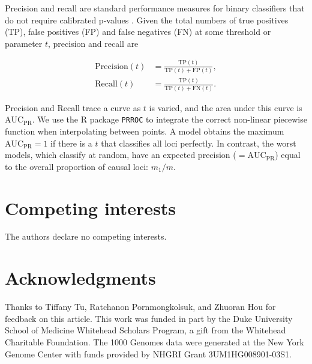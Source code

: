\documentclass[9pt,lineno]{elife}
\newcommand{\auc}{\text{AUC}_\text{PR}}
\begin{document}
Precision and recall are standard performance measures for binary classifiers that do not require calibrated p-values \citep{grau_prroc:_2015}.
Given the total numbers of true positives (TP), false positives (FP) and false negatives (FN) at some threshold or parameter $t$, precision and recall are
\begin{linenomath*}
  \begin{align*}
    \text{Precision}(t)
    &=
      \frac{ \text{TP}(t) }{ \text{TP}(t) + \text{FP}(t) }
      , \\
    \text{Recall}(t)
    &=
      \frac{ \text{TP}(t) }{ \text{TP}(t) + \text{FN}(t) }
      .
  \end{align*}
\end{linenomath*}
Precision and Recall trace a curve as $t$ is varied, and the area under this curve is $\auc$.
We use the R package \texttt{PRROC} to integrate the correct non-linear piecewise function when interpolating between points.
A model obtains the maximum $\auc = 1$ if there is a $t$ that classifies all loci perfectly.
In contrast, the worst models, which classify at random, have an expected precision ($= \auc$) equal to the overall proportion of causal loci:
$m_1/m$.


\section{Competing interests}
The authors declare no competing interests.

\section{Acknowledgments}
Thanks to Tiffany Tu, Ratchanon Pornmongkolsuk, and Zhuoran Hou for feedback on this article.
This work was funded in part by the Duke University School of Medicine Whitehead Scholars Program, a gift from the Whitehead Charitable Foundation.
The 1000 Genomes data were generated at the New York Genome Center with funds provided by NHGRI Grant 3UM1HG008901-03S1.
\end{document}
